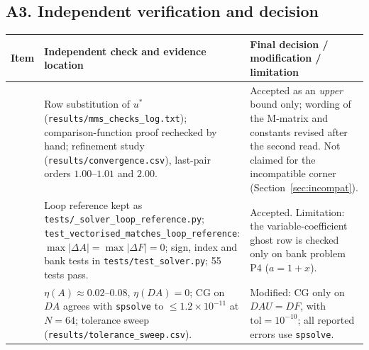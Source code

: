 \documentclass[11pt,a4paper]{article}
\theoremstyle{palplain}
\theoremstyle{paldef}
\theoremstyle{palremark}
\begin{document}
\subsection*{A3. Independent verification and decision}
\begin{table}[H]
\centering\small
\begin{tabular}{@{}>{\raggedright\arraybackslash}p{0.8cm}>{\raggedright\arraybackslash}p{7.4cm}>{\raggedright\arraybackslash}p{6.8cm}@{}}
\toprule
Item & Independent check and evidence location & Final decision / modification / limitation \\
\midrule
1 & Row substitution of $u^*$ (\texttt{results/mms\_checks\_log.txt}); comparison-function proof
  rechecked by hand; refinement study (\texttt{results/convergence.csv}), last-pair orders
  $1.00$--$1.01$ and $2.00$. &
  Accepted as an \emph{upper} bound only; wording of the M-matrix and constants revised after the
  second read. Not claimed for the incompatible corner (Section~\ref{sec:incompat}). \\
2 & Loop reference kept as \texttt{tests/\_solver\_loop\_reference.py};
  \texttt{test\_vectorised\_matches\_loop\_reference}: $\max|\Delta A|=\max|\Delta F|=0$; sign,
  index and bank tests in \texttt{tests/test\_solver.py}; 55 tests pass. &
  Accepted. Limitation: the variable-coefficient ghost row is checked only on bank problem P4
  ($a=1+x$). \\
3 & $\eta(A)\approx0.02$--$0.08$, $\eta(DA)=0$; CG on $DA$ agrees with \texttt{spsolve} to
  $\le1.2\times10^{-11}$ at $N=64$; tolerance sweep (\texttt{results/tolerance\_sweep.csv}). &
  Modified: CG only on $DAU=DF$, with $\mathrm{tol}=10^{-10}$; all reported errors use
  \texttt{spsolve}. \\
\bottomrule
\end{tabular}
\end{table}
\end{document}
